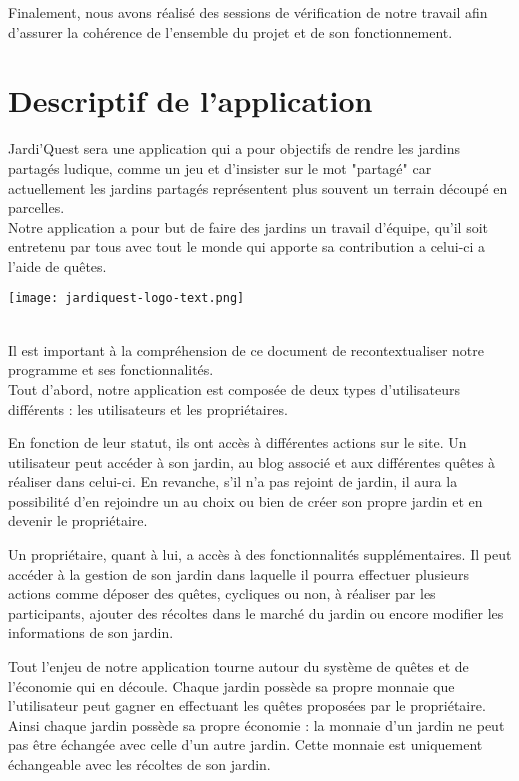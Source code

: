 \documentclass[12pt,titlepage]{report}
\begin{document}
Finalement, nous avons réalisé des sessions de vérification de notre travail afin d’assurer la cohérence de l’ensemble du projet et de son fonctionnement.

\chapter{Descriptif de l’application}

Jardi'Quest sera une application qui a pour objectifs de rendre les jardins partagés ludique, comme un jeu et d'insister sur le mot "partagé" car actuellement les jardins partagés représentent plus souvent un terrain découpé en parcelles. \\ 
Notre application a pour but de faire des jardins un travail d'équipe, qu'il soit entretenu par tous avec tout le monde qui apporte sa contribution a celui-ci a l'aide de quêtes. \\ 


\begin{center}
    \texttt{[image: jardiquest-logo-text.png]} 
\end{center}
\\[0.6cm]


Il est important à la compréhension de ce document de recontextualiser notre programme et ses fonctionnalités.\\[0.4cm]

Tout d’abord,  notre application est composée de deux types d’utilisateurs différents : les utilisateurs et les propriétaires.

En fonction de leur statut, ils ont accès à différentes actions sur le site.
Un utilisateur peut accéder à son jardin, au blog associé et aux différentes quêtes à réaliser dans celui-ci. En revanche, s’il n’a pas rejoint de jardin, il aura la possibilité d’en rejoindre un au choix ou bien de créer son propre jardin et en devenir le propriétaire.

Un propriétaire, quant à lui, a accès à des fonctionnalités supplémentaires. Il peut accéder à la gestion de son jardin dans laquelle il pourra effectuer plusieurs actions comme déposer des quêtes, cycliques ou non, à réaliser par les participants, ajouter des récoltes dans le marché du jardin ou encore modifier les informations de son jardin.

Tout l’enjeu de notre application tourne autour du système de quêtes et de l’économie qui en découle. Chaque jardin possède sa propre monnaie que l’utilisateur peut gagner en effectuant les quêtes proposées par le propriétaire. Ainsi chaque jardin possède sa propre économie : la monnaie d’un jardin ne peut pas être échangée avec celle d’un autre jardin. Cette monnaie est uniquement échangeable avec les récoltes de son jardin. \\ \\
\end{document}
